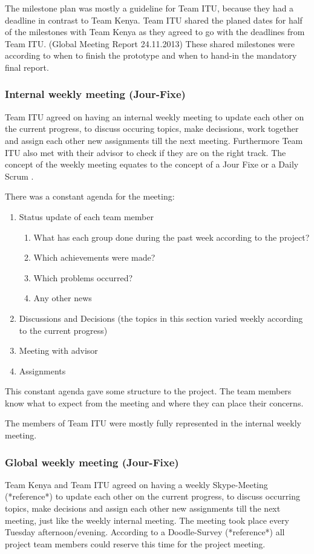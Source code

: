 The milestone plan was mostly a guideline for Team ITU, because they had a deadline in contrast to Team Kenya. Team ITU shared the planed dates for half of the milestones with Team Kenya as they agreed to go with the deadlines from Team ITU. (Global Meeting Report 24.11.2013) These shared milestones were according to when to finish the prototype and when to hand-in the mandatory final report.

\subsubsection{Internal weekly meeting (Jour-Fixe)}
Team ITU agreed on having an internal weekly meeting to update each other on the current progress, to discuss occuring topics, make decissions, work together and assign each other new assignments till the next meeting. Furthermore Team ITU also met with their advisor to check if they are on the right track. The concept of the weekly meeting equates to the concept of a Jour Fixe  or a Daily Scrum .

There was a constant agenda for the meeting:

	\begin{enumerate}
		\item Status update of each team member
			\begin{enumerate}
				\item What has each group done during the past week according to the project?
				\item Which achievements were made?	
				\item Which problems occurred?
				\item Any other news
			\end{enumerate}
		\item Discussions and Decisions (the topics in this section varied weekly according to the current progress)
		\item Meeting with advisor	
		\item Assignments
	\end{enumerate}

This constant agenda gave some structure to the project. The team members know what to expect from the meeting and where they can place their concerns.

The members of Team ITU were mostly fully represented in the internal weekly meeting. 

\subsubsection {Global weekly meeting (Jour-Fixe)}
Team Kenya and Team ITU agreed on having a weekly Skype-Meeting (*reference*) to update each other on the current progress, to discuss occurring topics, make decisions and assign each other new assignments till the next meeting, just like the weekly internal meeting. The meeting took place every Tuesday afternoon/evening. According to a Doodle-Survey (*reference*) all project team members could reserve this time for the project meeting.

